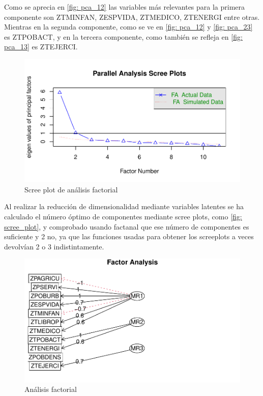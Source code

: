 \documentclass[twoside,openright,titlepage,numbers=noenddot,openany,headinclude,footinclude=true,
cleardoublepage=empty,abstractoff,BCOR=5mm,paper=a4,fontsize=12pt,main=spanish]{scrreprt}
\begin{document}
Como se aprecia en \eqref{fig: pca_12} las variables más relevantes para la primera componente son ZTMINFAN, ZESPVIDA, ZTMEDICO, ZTENERGI entre otras. Mientras en la segunda componente, como se ve en \eqref{fig: pca_12} y \eqref{fig: pca_23} es ZTPOBACT, y en la tercera componente, como también se refleja en \eqref{fig: pca_13} es ZTEJERCI.

\begin{figure}[H]
\includegraphics[scale=1]{scree_plot.pdf}
\caption{Scree plot de análisis factorial}
\label{fig: scree_plot}
\end{figure}

Al realizar la reducción de dimensionalidad mediante variables latentes se ha calculado el número óptimo de componentes mediante scree plots, como \eqref{fig: scree_plot}, y comprobado usando factanal que ese número de componentes es suficiente y 2 no, ya que las funciones usadas para obtener los screeplots a veces devolvían 2 o 3 indistintamente.

\begin{figure}[H]
\includegraphics[scale=1]{analisis_factorial.pdf}
\caption{Análisis factorial}
\label{fig: analisis_factorial}
\end{figure}
\end{document}
